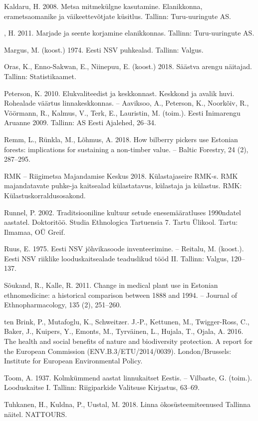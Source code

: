 \documentclass[estonian,]{article}
\begin{document}
Kaldaru, H. 2008. Metsa mitmekülgne kasutamine. Elanikkonna, erametsaomanike ja väikeettevõtjate küsitlus. Tallinn: Turu-uuringute AS.

, H. 2011. Marjade ja seente korjamine elanikkonnas. Tallinn: Turu-uuringute AS.

Margus, M. (koost.) 1974. Eesti NSV puhkealad. Tallinn: Valgus.

Oras, K., Enno-Sakwan, E., Niinepuu, E. (koost.) 2018. Säästva arengu näitajad. Tallinn: Statistikaamet.

Peterson, K. 2010. Elukvaliteedist ja keskkonnast. Keskkond ja avalik huvi. Rohealade väärtus linnakeskkonnas. -- Aaviksoo, A., Peterson, K., Noorkõiv, R., Vöörmann, R., Kalmus, V., Terk, E., Lauristin, M. (toim.). Eesti Inimarengu Aruanne 2009. Tallinn: AS Eesti Ajalehed, 26--34.

Remm, L., Rünkla, M., Lõhmus, A. 2018. How bilberry pickers use Estonian forests: implications for sustaining a non-timber value. -- Baltic Forestry, 24 (2), 287--295.

RMK -- Riigimetsa Majandamise Keskus 2018. Külastajaseire RMK-s. RMK majandatavate puhke-ja kaitsealad külastatavus, külastaja ja külastus. RMK: Külastuskorraldusosakond.

Runnel, P. 2002. Traditsiooniline kultuur setude enesemääratluses 1990ndatel aastatel. Doktoritöö. Studia Ethnologica Tartuensia 7. Tartu Ülikool. Tartu: Ilmamaa, OÜ Greif.

Ruus, E. 1975. Eesti NSV jõhvikasoode inventeerimine. -- Reitalu, M. (koost.). Eesti NSV riiklike looduskaitsealade teaduslikud tööd II. Tallinn: Valgus, 120--137.

Sõukand, R., Kalle, R. 2011. Change in medical plant use in Estonian ethnomedicine: a historical comparison between 1888 and 1994. -- Journal of Ethnopharmacology, 135 (2), 251--260.

ten Brink, P., Mutafoglu, K., Schweitzer. J.-P., Kettunen, M., Twigger-Ross, C., Baker, J., Kuipers, Y., Emonts, M., Tyrväinen, L., Hujala, T., Ojala, A. 2016. The health and social benefits of nature and biodiversity protection. A report for the European Commission (ENV.B.3/ETU/2014/0039). London/Brussels: Institute for European Environmental Policy.

Toom, A. 1937. Kolmkümmend aastat linnukaitset Eestis. -- Vilbaste, G. (toim.). Looduskaitse I. Tallinn: Riigiparkide Valitsuse Kirjastus, 63--69.

Tuhkanen, H., Kuldna, P., Uustal, M. 2018. Linna ökosüsteemiteenused Tallinna näitel. NATTOURS.
\end{document}
